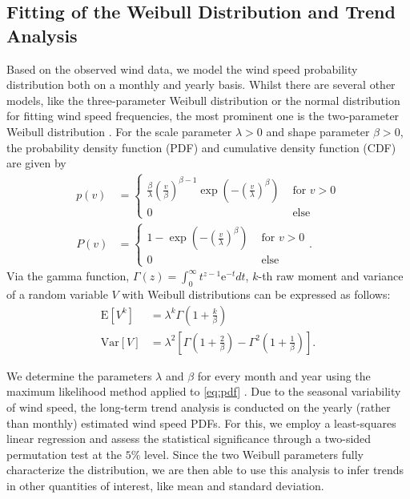 \documentclass{article}
\theoremstyle{plain}
\theoremstyle{definition}
\theoremstyle{remark}
\begin{document}
\subsection{Fitting of the Weibull Distribution and Trend Analysis}\label{sec:weibull}
Based on the observed wind data, we model the wind speed probability distribution both on a monthly and yearly basis.
Whilst there are several other models, like the three-parameter Weibull distribution or the normal distribution for fitting wind speed frequencies, the most prominent one is the two-parameter Weibull distribution
\cite{review, statanalysis, mohammadi2016assessing}.
For the scale parameter $\lambda >0$ and shape parameter $\beta >0$, the probability density function (PDF) and cumulative density function (CDF) are given by
\begin{align}
    \label{eq:pdf}
    p(v) &=
    \begin{cases}
        \frac{\beta}{\lambda} \left( \frac{v}{\beta}\right)^{\beta-1} 
        \exp{ \left( -\left(\frac{v}{\lambda}\right)^\beta \right)} & \text{  for } v>0 \\
        0 & \text{ else}
    \end{cases} \\
    \label{eq:cdf}
    P(v)&=
    \begin{cases}
        1- \exp{\left(-\left(\frac{v}{\lambda}\right)^\beta \right)} & \text{  for } v>0 \\
        0 & \text{ else}
    \end{cases}.
\end{align}
Via the gamma function, $\Gamma(z)= \int_{0}^{\infty}t^{z-1} \mathrm{e}^{-t}dt$, 
$k$-th raw moment and variance of a random variable $V$ with Weibull distributions can be expressed as follows: 
\begin{align}  
    \mathrm{E}[V^k] &= \lambda^k \Gamma \left( 1 + \frac{k}{\beta} \right) \label{eq:n-raw-moment} \\
    \mathrm{Var}[V] &= \lambda^2 \left[  \Gamma \left( 1 + \frac{2}{\beta}\right) \label{eq:var}
    - \Gamma^2 \left( 1 + \frac{1}{\beta}\right)\right].
\end{align}

We determine the parameters $\lambda$ and $\beta$ for every month and year using 
the maximum likelihood method applied to \eqref{eq:pdf} \cite{mohammadi2016assessing}.
Due to the seasonal variability of wind speed, the long-term trend analysis is conducted on the yearly 
(rather than monthly) estimated wind speed PDFs. For this, we employ a least-squares linear regression and assess the statistical significance through a two-sided permutation test at the $5\%$ level. 
Since the two Weibull parameters fully characterize the distribution, we are then able to use this analysis to infer trends in other quantities of interest, like mean and standard deviation.
\end{document}

